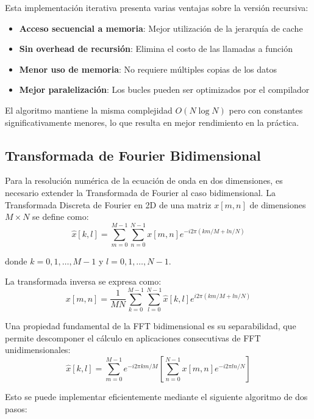 \documentclass[a4paper]{article}
\begin{document}
Esta implementación iterativa presenta varias ventajas sobre la versión recursiva:
\begin{itemize}
    \item \textbf{Acceso secuencial a memoria}: Mejor utilización de la jerarquía de cache
    \item \textbf{Sin overhead de recursión}: Elimina el costo de las llamadas a función
    \item \textbf{Menor uso de memoria}: No requiere múltiples copias de los datos
    \item \textbf{Mejor paralelización}: Los bucles pueden ser optimizados por el compilador
\end{itemize}

El algoritmo mantiene la misma complejidad $O(N \log N)$ pero con constantes significativamente menores, lo que resulta en mejor rendimiento en la práctica.

\subsection{Transformada de Fourier Bidimensional}

Para la resolución numérica de la ecuación de onda en dos dimensiones, es necesario extender la Transformada de Fourier al caso bidimensional. La Transformada Discreta de Fourier en 2D de una matriz $x[m,n]$ de dimensiones $M \times N$ se define como:
\begin{equation}
    \hat{x}[k,l] = \sum_{m=0}^{M-1} \sum_{n=0}^{N-1} x[m,n] e^{-i2\pi (km/M + ln/N)}
\end{equation}

donde $k = 0, 1, \ldots, M-1$ y $l = 0, 1, \ldots, N-1$.

La transformada inversa se expresa como:
\begin{equation}
    x[m,n] = \frac{1}{MN} \sum_{k=0}^{M-1} \sum_{l=0}^{N-1} \hat{x}[k,l] e^{i2\pi (km/M + ln/N)}
\end{equation}

Una propiedad fundamental de la FFT bidimensional es su separabilidad, que permite descomponer el cálculo en aplicaciones consecutivas de FFT unidimensionales:
\begin{equation}
    \hat{x}[k,l] = \sum_{m=0}^{M-1} e^{-i2\pi km/M} \left[ \sum_{n=0}^{N-1} x[m,n] e^{-i2\pi ln/N} \right]
\end{equation}

Esto se puede implementar eficientemente mediante el siguiente algoritmo de dos pasos:
\end{document}
